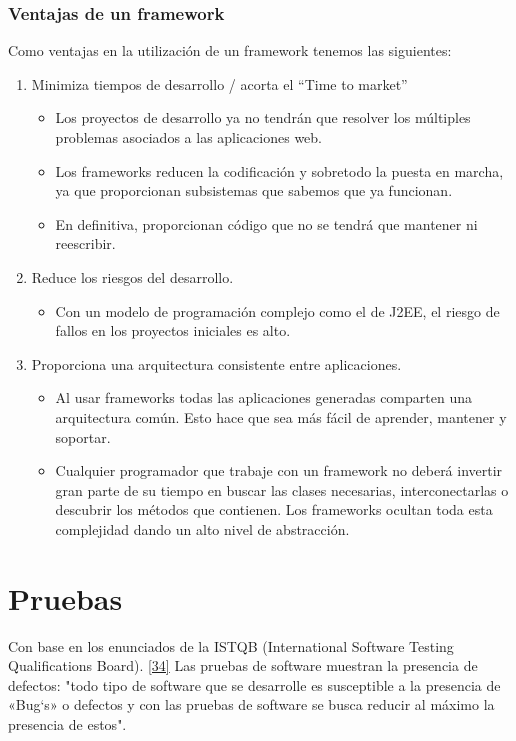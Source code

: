 \subsubsection {Ventajas de un framework}
Como ventajas en la utilización de un framework tenemos las siguientes:

\begin{enumerate}
	\item Minimiza tiempos de desarrollo / acorta el “Time to market”
	\begin{itemize}
	\item Los proyectos de desarrollo ya no tendrán que resolver los múltiples problemas asociados a las aplicaciones web.
	\item  Los frameworks reducen la codificación y sobretodo la puesta en marcha, ya que proporcionan subsistemas que sabemos que ya funcionan. \item  En definitiva, proporcionan código que no se tendrá que mantener ni reescribir.
	\end{itemize}
	\item Reduce los riesgos del desarrollo.
	\begin{itemize}
		\item Con un modelo de programación complejo como el de J2EE, el riesgo de fallos en los proyectos iniciales es alto.
	\end{itemize}
	\item Proporciona una arquitectura consistente entre aplicaciones.
	\begin{itemize}
		\item Al usar frameworks todas las aplicaciones generadas comparten una arquitectura común. Esto hace que sea más fácil de aprender, mantener y soportar.
		\item Cualquier programador que trabaje con un framework no deberá invertir gran parte de su tiempo en buscar las clases necesarias, interconectarlas o descubrir los métodos que contienen. Los frameworks ocultan toda esta complejidad dando un alto nivel de abstracción. 
	\end{itemize}
\end{enumerate}

\newpage

\section{Pruebas}

Con base en los enunciados de la ISTQB (International Software Testing Qualifications Board). \hyperlink{b34}{[34]} Las pruebas de software muestran la presencia de defectos: "todo tipo de software que se desarrolle es susceptible a la presencia de «Bug`s» o defectos y con las pruebas de software se busca reducir al máximo la presencia de estos".\\

